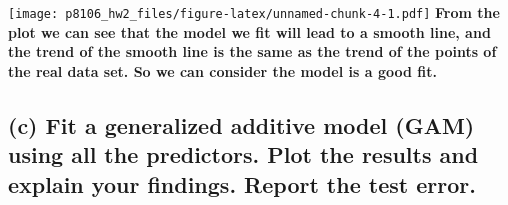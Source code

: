 \documentclass[
]{article}
\newenvironment{Shaded}{\begin{snugshade}}{\end{snugshade}}
\newcommand{\AttributeTok}[1]{\textcolor[rgb]{0.77,0.63,0.00}{#1}}
\newcommand{\DecValTok}[1]{\textcolor[rgb]{0.00,0.00,0.81}{#1}}
\newcommand{\FunctionTok}[1]{\textcolor[rgb]{0.00,0.00,0.00}{#1}}
\newcommand{\NormalTok}[1]{#1}
\newcommand{\OtherTok}[1]{\textcolor[rgb]{0.56,0.35,0.01}{#1}}
\newcommand{\SpecialCharTok}[1]{\textcolor[rgb]{0.00,0.00,0.00}{#1}}
\begin{document}
\begin{Shaded}
\end{Shaded}

\texttt{[image: p8106\_hw2\_files/figure-latex/unnamed-chunk-4-1.pdf]}
\textbf{From the plot we can see that the model we fit will lead to a
smooth line, and the trend of the smooth line is the same as the trend
of the points of the real data set. So we can consider the model is a
good fit.}

\hypertarget{c-fit-a-generalized-additive-model-gam-using-all-the-predictors.-plot-the-results-and-explain-your-findings.-report-the-test-error.}{%
\subsection{(c) Fit a generalized additive model (GAM) using all the
predictors. Plot the results and explain your findings. Report the test
error.}\label{c-fit-a-generalized-additive-model-gam-using-all-the-predictors.-plot-the-results-and-explain-your-findings.-report-the-test-error.}}
\end{document}
